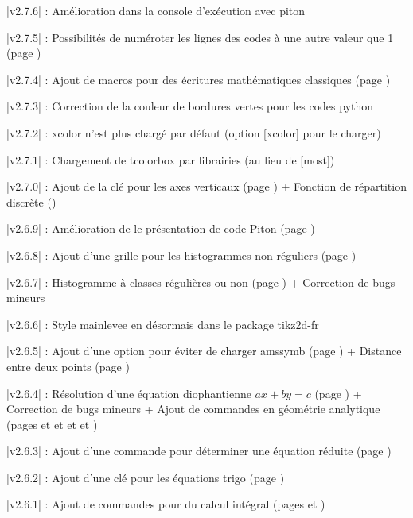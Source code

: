 {{{{{\small \bverb|v2.7.6| : Amélioration dans la console d'exécution avec \textsf{piton}}

{\small \bverb|v2.7.5| : Possibilités de numéroter les lignes des codes à une autre valeur que 1 (page \pageref{codenumlignes})}

{\small \bverb|v2.7.4| : Ajout de macros pour des écritures mathématiques classiques (page \pageref{ecrituresmath})}

{\small \bverb|v2.7.3| : Correction de la couleur de bordures vertes pour les codes python}

{\small \bverb|v2.7.2| : \textsf{xcolor} n'est plus chargé par défaut (option \textsf{[xcolor]} pour le charger)}

{\small \bverb|v2.7.1| : Chargement de \textsf{tcolorbox} par librairies (au lieu de \textsf{[most]})}

{\small \bverb|v2.7.0| : Ajout de la clé  pour les axes verticaux (page \pageref{reperagetikz}) + Fonction de répartition discrète (\pageref{fctrepart})}

{\small \bverb|v2.6.9| : Amélioration de le présentation de code \textsf{Piton} (page \pageref{pythonpiton})}

{\small \bverb|v2.6.8| : Ajout d'une grille pour les histogrammes non réguliers (page \pageref{histo})}

{\small \bverb|v2.6.7| : Histogramme à classes régulières ou non (page \pageref{histo}) + Correction de bugs mineurs}

{\small \bverb|v2.6.6| : Style \textsf{mainlevee} en \TikZ{} désormais dans le package \textsf{tikz2d-fr}}

{\small \bverb|v2.6.5| : Ajout d'une option  pour éviter de charger \textsf{amssymb} (page \pageref{amssymb})} + Distance entre deux points (page \pageref{normevect})

{\small \bverb|v2.6.4| : Résolution d'une équation diophantienne $ax+by=c$ (page \pageref{eqdioph}) + Correction de bugs mineurs + Ajout de commandes en géométrie analytique (pages \pageref{affcoord} et \pageref{eqcartplan} et \pageref{eqparamdroite} et \pageref{eqcartdroite} et \pageref{distptplan})}

{\small \bverb|v2.6.3| : Ajout d'une commande pour déterminer une équation réduite (page \pageref{eqreduite})}

{\small \bverb|v2.6.2| : Ajout d'une clé  pour les équations trigo (page \pageref{cercletrigo})}

{\small \bverb|v2.6.1| : Ajout de commandes pour du calcul intégral (pages \pageref{calcintegr} et \pageref{integrtikz})}

}}}}
